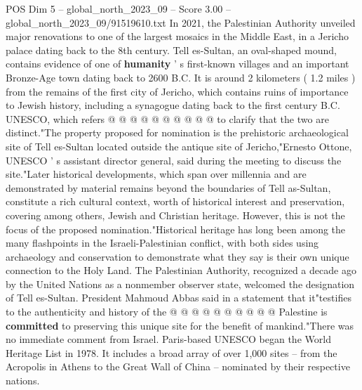 \begin{textsample}{POS Dim 5 – global\_north\_2023\_09 – Score 3.00 – global\_north\_2023\_09/91519610.txt}
In 2021, the Palestinian Authority unveiled major renovations to one of the largest mosaics in the Middle East, in a Jericho palace dating back to the 8th century.
Tell es-Sultan, an oval-shaped mound, contains evidence of one of \textbf{humanity} ' s first-known villages and an important Bronze-Age town dating back to 2600 B.C.
It is around 2 kilometers ( 1.2 miles ) from the remains of the first city of Jericho, which contains ruins of importance to Jewish history, including a synagogue dating back to the first century B.C.
UNESCO, which refers @ @ @ @ @ @ @ @ @ @ to clarify that the two are distinct."The property proposed for nomination is the prehistoric archaeological site of Tell es-Sultan located outside the antique site of Jericho,"Ernesto Ottone, UNESCO ' s assistant director general, said during the meeting to discuss the site."Later historical developments, which span over millennia and are demonstrated by material remains beyond the boundaries of Tell as-Sultan, constitute a rich cultural context, worth of historical interest and preservation, covering among others, Jewish and Christian heritage.
However, this is not the focus of the proposed nomination."Historical heritage has long been among the many flashpoints in the Israeli-Palestinian conflict, with both sides using archaeology and conservation to demonstrate what they say is their own unique connection to the Holy Land.
The Palestinian Authority, recognized a decade ago by the United Nations as a nonmember observer state, welcomed the designation of Tell es-Sultan.
President Mahmoud Abbas said in a statement that it"testifies to the authenticity and history of the @ @ @ @ @ @ @ @ @ @ Palestine is \textbf{committed} to preserving this unique site for the benefit of mankind."There was no immediate comment from Israel.
Paris-based UNESCO began the World Heritage List in 1978.
It includes a broad array of over 1,000 sites -- from the Acropolis in Athens to the Great Wall of China -- nominated by their respective nations.

\end{textsample}
